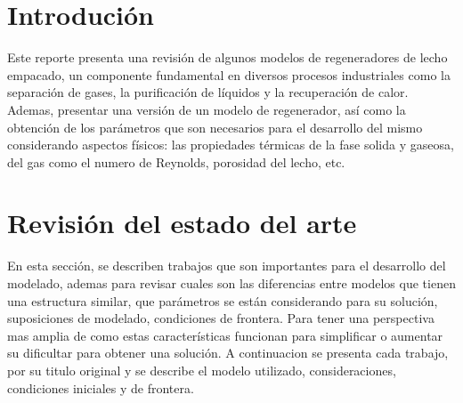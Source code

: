 \documentclass[12pt,letterpaper,final]{article}%
\begin{document}
\section{Introduci\'on}
Este reporte presenta una revisión de algunos modelos de regeneradores de lecho empacado, un componente fundamental en diversos procesos industriales como la separación de gases, la purificación de líquidos y la recuperación de calor. Ademas, presentar una versión de un modelo de regenerador, así como la obtención de los parámetros que son necesarios para el desarrollo del mismo considerando aspectos físicos: las propiedades térmicas de la fase solida y gaseosa, del gas como el numero de Reynolds, porosidad del lecho, etc.

\section{Revisión del estado del arte}
En esta sección, se describen trabajos que son importantes para el desarrollo del modelado, ademas para revisar cuales son las diferencias entre modelos que tienen una estructura similar, que parámetros se están considerando para su solución, suposiciones de modelado, condiciones de frontera. Para tener una perspectiva mas amplia de como estas características funcionan para simplificar o aumentar su dificultar para obtener una solución. A continuacion se presenta cada trabajo, por su titulo original y se describe el modelo utilizado, consideraciones, condiciones iniciales y de frontera. 
\end{document}
